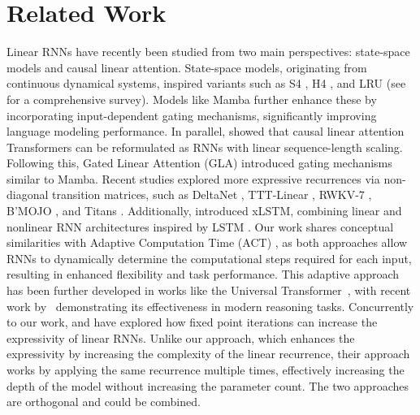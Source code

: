 \section{Related Work}
\label{sec:related_work}
\vspace{-2mm}
Linear RNNs have recently been studied from two main perspectives: state-space models and causal linear attention. State-space models, originating from continuous dynamical systems, inspired variants such as S4 \citep{gu-iclr22a}, H4 \citep{fu-iclr23a}, and LRU \citep{orvieto-icml23a} (see \citet{tiezzi2024statespacemodelinglongsequence} for a comprehensive survey). Models like Mamba \citep{gu2023mamba, dao-icml24a} further enhance these by incorporating input-dependent gating mechanisms, significantly improving language modeling performance.
In parallel, \citet{katharopoulos-icml20a} showed that causal linear attention Transformers can be reformulated as RNNs with linear sequence-length scaling. Following this, Gated Linear Attention (GLA) \citep{yang-icml24a} introduced gating mechanisms similar to Mamba. Recent studies explored more expressive recurrences via non-diagonal transition matrices, such as DeltaNet \citep{schlag-icml21a,irie2023practical,yang-neurips24a}, TTT-Linear \citep{sun-arxiv24a}, RWKV-7 \citep{peng2025rwkv7gooseexpressivedynamic}, B'MOJO \citep{zancato-neurips24a}, and Titans \citep{behrouz2024titans}. Additionally, \citet{beck-neurips24a} introduced xLSTM, combining linear and nonlinear RNN architectures inspired by LSTM \citep{hochreiter1997long}.
Our work shares conceptual similarities with Adaptive Computation Time (ACT) \citep{graves2016adaptive}, as both approaches allow RNNs to dynamically determine the computational steps required for each input, resulting in enhanced flexibility and task performance. 
This adaptive approach has been further developed in works like the Universal Transformer~\citep{dehghani-iclr19a}, with recent work by~\citet{geiping2025scaling} demonstrating its effectiveness in modern reasoning tasks. Concurrently to our work, \citet{schone2025implicit} and \citet{movahedi2025fixedpoint} have explored how fixed point iterations can increase the expressivity of linear RNNs. Unlike our approach, which enhances the expressivity by increasing the complexity of the linear recurrence, their approach works by applying the same recurrence multiple times, effectively increasing the depth of the model without increasing the parameter count. The two approaches are orthogonal and could be combined.

